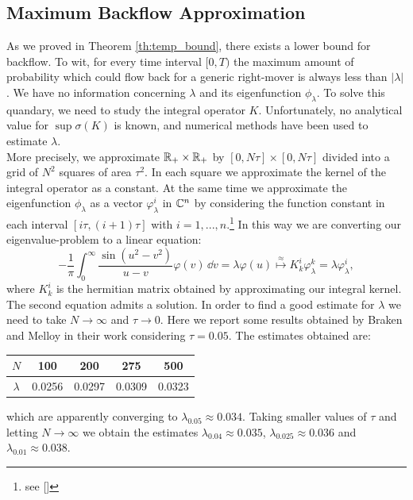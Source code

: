 \subsection{Maximum Backflow Approximation}
	As we proved in Theorem \ref{th:temp_bound}, there exists a lower bound for backflow. To wit, for every time interval $[0,T)$ the maximum amount of probability which could flow back for a generic right-mover is always less than $|\lambda|$. We have no information concerning $\lambda$ and its eigenfunction $\phi_\lambda$. To solve this quandary, we need to study the integral operator $K$. Unfortunately, no analytical value for $\sup \sigma(K)$ is known, and numerical methods have been used to estimate $\lambda$. \\
	More precisely, we approximate ${\mathbb R}_+\times{\mathbb R}_+$ by $[0,N\tau]\times[0,N\tau]$ divided into a grid of $N^2$ squares of area $\tau^2$. In each square we approximate the kernel of the integral operator as a constant. At the same time we approximate the eigenfunction $\phi_{\lambda}$ as a vector $\varphi_\lambda^i$ in ${\mathbb C}^n$ by considering the function constant in each interval $[i\tau,(i+1)\tau]$ with $i=1,...,n$.\footnote{see [\citealp[Sect. 5]{bracken}]} In this way we are converting our eigenvalue-problem to a linear equation:
	\begin{equation}
		-\frac{1}{\pi}\int_{0}^{\infty}\frac{\sin(u^2-v^2)}{u-v}\varphi(v)\, \dd v=\lambda\varphi(u) \stackrel{\approx}{\longmapsto} K_k^i\varphi_\lambda^k=\lambda\varphi_\lambda^i,
		\label{eq:eigenvalue_approx}
	\end{equation}
	where $K_k^i$ is the hermitian matrix obtained by approximating our integral kernel. The second equation admits a solution. In order to find a good estimate for $\lambda$ we need to take $N\to\infty$ and $\tau\to0$. Here we report some results obtained by Braken and Melloy in their work considering $\tau=0.05$. The estimates obtained are:
	\begin{center}
		\centering
		\footnotesize
		\begin{tabular}{|c|cccc|}
			\toprule
			$N$ & 100 & 200 & 275 & 500\\
			\midrule
			$\lambda$ & 0.0256 & 0.0297 & 0.0309 & 0.0323\\
			\bottomrule
		\end{tabular}
	\end{center}
	which are apparently converging to $\lambda_{0.05}\approx0.034$. Taking smaller values of $\tau$ and letting $N\to\infty$ we obtain the estimates $\lambda_{0.04}\approx0.035$, $\lambda_{0.025}\approx0.036$ and $\lambda_{0.01}\approx0.038$.\\%
	

